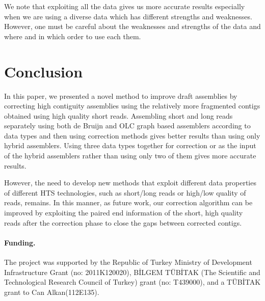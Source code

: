\documentclass{llncs}
\begin{document}
We note that exploiting all the data gives us more accurate results especially when we are using a diverse data which has different strengths and weaknesses. However, one must be careful about the weaknesses and strengths of the data and where and in which order to use each them.
\section{Conclusion}
\label{concl}
In this paper, we presented a novel method to improve draft assemblies by correcting high contiguity assemblies using the relatively more fragmented contigs obtained using high quality short reads. Assembling short and long reads separately using both de Bruijn and OLC graph based assemblers according to data types and then using correction methods gives better results than using only hybrid assemblers. Using three data types together for correction or as the input of the hybrid assemblers rather than using only two of them gives more accurate results.

However, the need to develop new methods that exploit different data properties of different HTS technologies, such as short/long reads or high/low quality of reads, remains. In this manner, as future work, our correction algorithm can be improved by exploiting the paired end information of the short, high quality reads after the correction phase to close the gaps between corrected contigs.

\paragraph{Funding.}

The project was supported by the Republic of Turkey Ministry of Development Infrastructure Grant (no: 2011K120020), BİLGEM TÜBİTAK (The Scientific and Technological Research Council of Turkey) grant (no: T439000), and a TÜBİTAK grant to Can Alkan(112E135).\\
\end{document}
